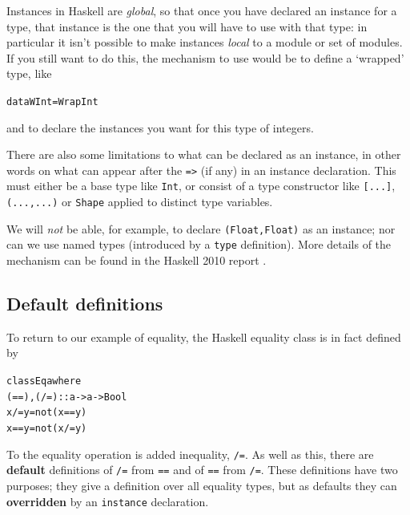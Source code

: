 Instances in Haskell are \emph{global}, so that once you have declared an instance for a type, that instance is the one that you will have to use with that type: in particular it isn't possible to make instances \emph{local} to a module or set of modules. If you still want to do this, the mechanism to use would be to define a `wrapped' type, like
\begin{alltt}
data WInt = Wrap Int
\end{alltt}
and to declare the instances you want for this type of integers.

There are also some limitations to what can be declared as an instance, in other
words on what can appear after the \texttt{=>} (if any) in an instance
declaration. This must either be a base type like \texttt{Int}, or consist of a
type constructor like \texttt{[...]}, \texttt{(...,...)} or \texttt{Shape} applied to
distinct type variables.

We will {\em not\/} be able, for example, to declare
\texttt{(Float,Float)} as an instance; nor can we use named types (introduced by
a \texttt{type} definition). More details of the mechanism can be found in the
Haskell 2010 report \cite{haskell2010}.




\subsection*{Default definitions}

To return to our example of equality, the Haskell equality class is in fact
defined by
\begin{alltt}
class Eq a where
  (==), (/=) :: a -> a -> Bool
  x /= y     = not (x==y)
  x == y     = not (x/=y)
\end{alltt}
To the equality operation is added inequality, \texttt{/=}. As well as this,
there are \textbf{default} definitions of \texttt{/=} from \texttt{==} and of \texttt{==} from
\texttt{/=}. These definitions have
two purposes; they give a definition over all equality types, but as
defaults
they can \textbf{overridden} by an \texttt{instance} declaration. 

